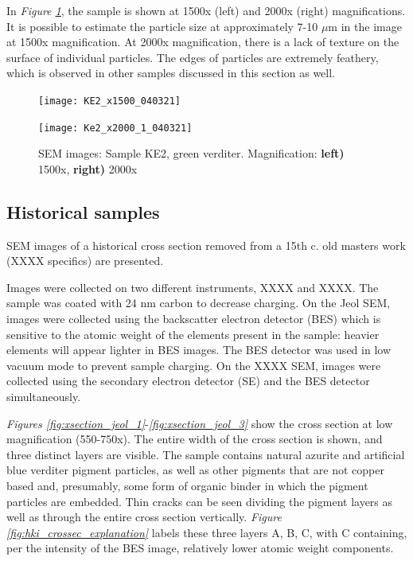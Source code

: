 In \textit{Figure \ref{fig:KE2_sem_2}}, the sample is shown at 1500x (left) and 2000x (right) magnifications. It is possible to estimate the particle size at approximately 7-10 $\mu$m in the image at 1500x magnification. At 2000x magnification, there is a lack of texture on the surface of individual particles. The edges of particles are extremely feathery, which is observed in other samples discussed in this section as well.

\begin{figure}[H]
\centering
\begin{minipage}{.45\textwidth}
  \centering
  \texttt{[image: KE2\_x1500\_040321]}
\end{minipage}
\begin{minipage}{.45\textwidth}
  \centering
  \texttt{[image: Ke2\_x2000\_1\_040321]}
\end{minipage}
\caption[SEM images: Sample KE2, green verditer]{SEM images: Sample KE2, green verditer. Magnification: \textbf{left)} 1500x, \textbf{right)} 2000x}
\label{fig:KE2_sem_2}
\end{figure}

\subsection[Historical samples]{Historical samples}
\label{subsection3.1.3}

SEM images of a historical cross section removed from a 15th c. old masters work (XXXX specifics) are presented.

Images were collected on two different instruments, XXXX and XXXX. The sample was coated with 24 nm carbon to decrease charging. On the Jeol SEM, images were collected using the backscatter electron detector (BES) which is sensitive to the atomic weight of the elements present in the sample: heavier elements will appear lighter in BES images. The BES detector was used in low vacuum mode to prevent sample charging. On the XXXX SEM, images were collected using the secondary electron detector (SE) and the BES detector simultaneously. 

\textit{Figures \ref{fig:xsection_jeol_1}}-\textit{\ref{fig:xsection_jeol_3}} show the cross section at low magnification (550-750x). The entire width of the cross section is shown, and three distinct layers are visible. The sample contains natural azurite and artificial blue verditer pigment particles, as well as other pigments that are not copper based and, presumably, some form of organic binder in which the pigment particles are embedded. Thin cracks can be seen dividing the pigment layers as well as through the entire cross section vertically. \textit{Figure \ref{fig:hki_crossec_explanation}} labels these three layers A, B, C, with C containing, per the intensity of the BES image, relatively lower atomic weight components. 

